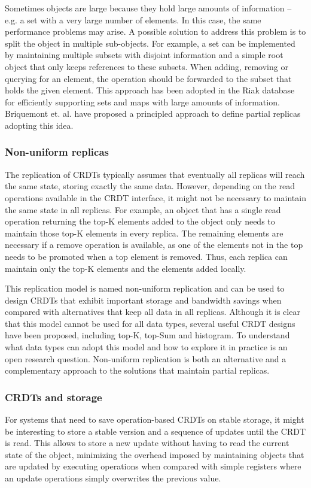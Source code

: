\documentclass[12pt]{article}
\begin{document}
Sometimes objects are large because they hold large amounts of information -- e.g. 
a set with a very large number of elements. 
In this case, the same performance problems may arise. 
A possible solution to address this problem is to split the object
in multiple sub-objects. For example, a set can be implemented by maintaining
multiple subsets with disjoint information and a simple root object that only keeps
references to these subsets. When adding, removing or querying for an element, the 
operation should be forwarded to the subset that holds the given element.  
This approach has been adopted in the Riak database for efficiently supporting
sets and maps with large amounts of information. 
Briquemont et. al. \cite{Briquemont15Conflict} have proposed a principled approach 
to define partial replicas adopting this idea.

\subsubsection{Non-uniform replicas}
The replication of CRDTs typically assumes that eventually all replicas
will reach the same state, storing exactly the same data.
However, depending on the read operations available in the CRDT interface, 
it might not be necessary to maintain the same state in all replicas.
For example, an object that has a single read operation returning the 
top-K elements added to the object only needs to maintain those top-K elements 
in every replica. 
The remaining elements are necessary if a remove operation is available,
as one of the elements not in the top needs to be promoted when a top element 
is removed. 
Thus, each replica can maintain only the top-K elements and the elements
added locally.

This replication model is named non-uniform replication \cite{Cabrita17Non}
and can be used to design CRDTs that exhibit important storage and bandwidth 
savings when compared with alternatives that keep all data in all replicas.
Although it is clear that this model cannot be used for all data types, 
several useful CRDT designs have been proposed, including top-K, top-Sum and
histogram. To understand what data types can adopt this model and how to 
explore it in practice is an open research question.
Non-uniform replication is both an alternative and a complementary approach 
to the solutions that maintain partial replicas.



\subsubsection{CRDTs and storage}
For systems that need to save operation-based CRDTs on stable storage,
it might be interesting to store a stable version and a sequence of updates
until the CRDT is read. 
This allows to store a new update without having to read the current state of
the object, minimizing the overhead imposed by maintaining objects
that are updated by executing operations when compared with simple registers
where an update operations simply overwrites the previous value.
\end{document}
